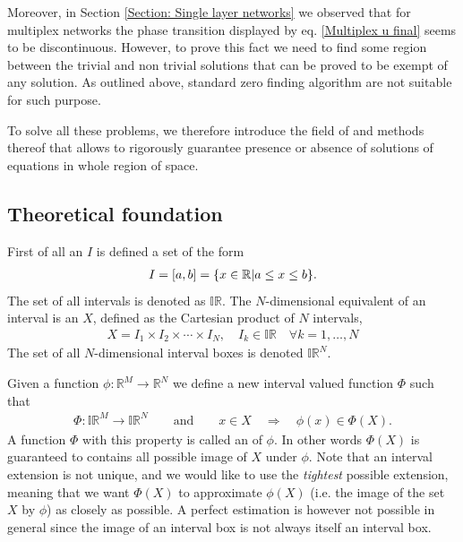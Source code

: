 \documentclass[
11pt, %
english, %
singlespacing, %
nolistspacing, %
liststotoc, %
headsepline, %
]{MastersDoctoralThesis} %
\begin{document}
Moreover, in Section \ref{Section: Single layer networks} we observed that for multiplex networks the phase transition displayed by eq. \eqref{Multiplex u final} seems to be discontinuous. However, to prove this fact we need to find some region between the trivial and non trivial solutions that can be proved to be exempt of any solution. As outlined above, standard zero finding algorithm are not suitable for such purpose.

To solve all these problems, we therefore introduce the field of  and methods thereof that allows to rigorously guarantee presence or absence of solutions of equations in whole region of space.

\subsection{Theoretical foundation}
\label{Section: Theoretical foundation of IA}

First of all an  $I$ is defined a set of the form
\begin{align}
	I = \left[a, b\right] = \{x \in \mathbb{R} | a \leq x \leq b\}.
\end{align}
The set of all intervals is denoted as $\mathbb{IR}$. The $N$-dimensional equivalent of an interval is an  $X$, defined as the Cartesian product of $N$ intervals,
\begin{align}
	X = I_1 \times I_2 \times \cdots \times I_N, \quad I_k \in \mathbb{IR} \quad \forall k = 1, \dots, N
\end{align}
The set of all $N$-dimensional interval boxes is denoted $\mathbb{IR}^N$.

Given a function $\phi : \mathbb{R}^M \rightarrow \mathbb{R}^N$ we define a new interval valued function $\Phi$ such that
\begin{align}
	\Phi : \mathbb{IR}^M \rightarrow \mathbb{IR}^N \qquad \text{and} \qquad x \in X \quad \Rightarrow \quad \phi(x) \in \Phi(X). \label{Definition interval extension}
\end{align}
A function $\Phi$ with this property is called an  of $\phi$. In other words $\Phi(X)$ is guaranteed to contains all possible image of $X$ under $\phi$. Note that an interval extension is not unique, and we would like to use the \emph{tightest} possible extension, meaning that we want $\Phi(X)$ to approximate $\phi(X)$ (i.e. the image of the set $X$ by $\phi$) as closely as possible. A perfect estimation is however not possible in general since the image of an interval box is not always itself an interval box.
\end{document}
